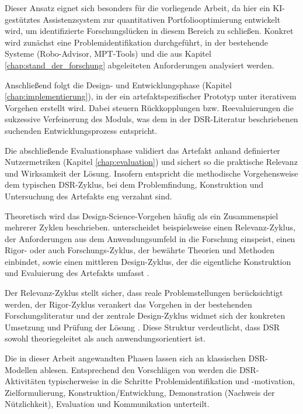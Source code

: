     Dieser Ansatz eignet sich besonders für die vorliegende Arbeit, da hier ein \acs{KI}-gestütztes Assistenzsystem zur quantitativen Portfoliooptimierung entwickelt wird, um identifizierte Forschungslücken in diesem Bereich zu schließen.
    Konkret wird zunächst eine Problemidentifikation durchgeführt, in der bestehende Systeme (Robo-Advisor, \acs{MPT}-Tools) und die aus Kapitel \ref{chap:stand_der_forschung} abgeleiteten Anforderungen analysiert werden.

    Anschließend folgt die Design- und Entwicklungsphase (Kapitel \ref{chap:implementierung}), in der ein artefaktspezifischer Prototyp unter iterativem Vorgehen erstellt wird.
    Dabei steuern Rückkopplungen bzw. Reevaluierungen die sukzessive Verfeinerung des Moduls, was dem in der \acs{DSR}-Literatur beschriebenen suchenden Entwicklungsprozess entspricht.

    Die abschließende Evaluationsphase validiert das Artefakt anhand definierter Nutzermetriken (Kapitel \ref{chap:evaluation}) und sichert so die praktische Relevanz und Wirksamkeit der Lösung.
    Insofern entspricht die methodische Vorgehensweise dem typischen \acs{DSR}-Zyklus, bei dem Problemfindung, Konstruktion und Untersuchung des Artefakts eng verzahnt sind.

    Theoretisch wird das Design-Science-Vorgehen häufig als ein Zusammenspiel mehrerer Zyklen beschrieben.
    \textcite[S. 2]{hevner2007} unterscheidet beispielsweise einen Relevanz-Zyklus, der Anforderungen aus dem Anwendungsumfeld in die Forschung einspeist, einen Rigor- oder auch Forschungs-Zyklus, der bewährte Theorien und Methoden einbindet, sowie einen mittleren Design-Zyklus, der die eigentliche Konstruktion und Evaluierung des Artefakts umfasst \autocite[S. 2 und 4]{hevner2007}.

    Der Relevanz-Zyklus stellt sicher, dass reale Problemstellungen berücksichtigt werden, der Rigor-Zyklus verankert das Vorgehen in der bestehenden Forschungsliteratur und der zentrale Design-Zyklus widmet sich der konkreten Umsetzung und Prüfung der Lösung \autocite[S. 2 und 3]{hevner2007}.
    Diese Struktur verdeutlicht, dass \acs{DSR} sowohl theoriegeleitet als auch anwendungsorientiert ist.

    Die in dieser Arbeit angewandten Phasen lassen sich an klassischen \acs{DSR}-Modellen ablesen.
    Entsprechend den Vorschlägen von \textcite[S. 46]{peffers2007} werden die \acs{DSR}-Aktivitäten typischerweise in die Schritte Problemidentifikation und -motivation, Zielformulierung, Konstruktion/Entwicklung, Demonstration (Nachweis der Nützlichkeit), Evaluation und Kommunikation unterteilt.

